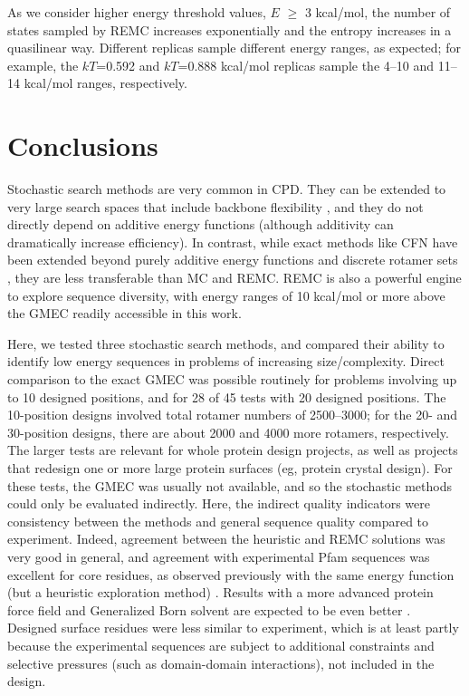 {{As we consider higher energy threshold values, $E$ $\ge$ 3 kcal/mol, the number of states sampled by REMC increases
exponentially and the entropy increases in a quasilinear way. Different replicas sample different energy ranges, as
expected; for example, the $kT$=0.592 and $kT$=0.888 kcal/mol replicas sample the 4--10 and 11--14 kcal/mol ranges, 
respectively. 

\section{Conclusions}
Stochastic search methods are very common in CPD. They can be extended to very large search spaces that include
backbone flexibility \cite{Fung08,Mandell09,Huang11}, and they do not directly depend on additive energy functions
(although additivity can dramatically increase efficiency). In contrast, while exact methods like CFN have been extended
beyond purely additive energy functions \cite{Ng11,Lucore15} and discrete rotamer sets \cite{Georgiev08,Hallen15},
they are less transferable than MC and REMC. REMC is also a powerful engine to explore sequence diversity, with energy
ranges of 10 kcal/mol or more above the GMEC readily accessible in this work.

Here, we tested three stochastic search methods, and compared their ability to identify low energy sequences in problems
of increasing size/complexity. Direct comparison to the exact GMEC was possible routinely for problems involving up to
10 designed positions, and for 28 of 45 tests with 20 designed positions. The 10-position designs involved total rotamer
numbers of 2500--3000; for the 20- and 30-position designs, there are about 2000 and 4000 more rotamers, respectively.
The larger tests are relevant for whole protein design projects, as well as projects that redesign one or more large
protein surfaces (eg, protein crystal design). For these tests, the GMEC was usually not available, and so the stochastic
methods could only be evaluated indirectly. Here, the indirect quality indicators were consistency between the methods
and general sequence quality compared to experiment. Indeed, agreement between the heuristic and REMC solutions was very
good in general, and agreement with experimental Pfam sequences was excellent for core residues, as observed previously
with the same energy function (but a heuristic exploration method) \cite{Schmidt09,Schmidt10}. Results with a more
advanced protein force field and Generalized Born solvent are expected to be even better \cite{Polydorides11,Simonson15}.
Designed surface residues were less similar to experiment, which is at least partly because the experimental sequences
are subject to additional constraints and selective pressures (such as domain-domain interactions), not included in the
design.  

}}
